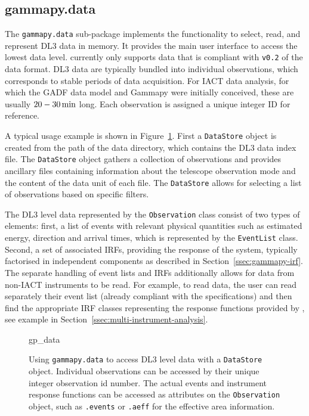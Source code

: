 \documentclass[traditabstract, longauth]{aa}
\newcommand{\code}[1]{\texttt{#1}}
\begin{document}
\subsection{gammapy.data}
\label{ssec:gammapy-data}
The \code{gammapy.data} sub-package implements the functionality to select,
read, and represent DL3 \gammaray data in memory. It provides the main user
interface to access the lowest data level. \gammapy currently only
supports data that is compliant with \code{v0.2} of the \gadf data format.
DL3 data are typically bundled into individual observations, which
corresponds to stable periods of data acquisition. For IACT data analysis,
for which the GADF data model and Gammapy were initially conceived,
these are usually $20 - 30\,{\rm min}$ long.
Each observation is assigned a unique integer ID for reference.

A typical usage example is shown in Figure~\ref{fig*:minted:gp_data}.
First a \code{DataStore} object is created from the path of the data
directory, which contains the DL3 data index file. The \code{DataStore}
object gathers a collection of observations and provides ancillary
files containing information about the telescope observation mode and the
content of the data unit of each file. The \code{DataStore} allows for
selecting a list of observations based on specific filters.

The DL3 level data represented by the \code{Observation} class consist
of two types of elements: first, a list of \gammaray events with relevant physical
quantities such as estimated energy, direction and arrival
times, which is represented by the \code{EventList} class. Second, a set of
associated IRFs, providing the response of the system, typically
factorised in independent components as described in
Section~\ref{ssec:gammapy-irf}. The separate handling of event lists and IRFs
additionally allows for data from non-IACT \gammaray instruments to be read. For
example, to read \fermi data, the user can read separately their event list
(already compliant with the \gadf specifications) and then find the appropriate
IRF classes representing the response functions provided by \fermi, see
example in Section~\ref{ssec:multi-instrument-analysis}.

\begin{figure}
	\small
	{gp_data}
	\caption{
        Using \code{gammapy.data} to access DL3 level data with a \code{DataStore} object.
        Individual observations can be accessed by their unique integer observation id number.
        The actual events and instrument response functions can be accessed
        as attributes on the \code{Observation} object, such as \code{.events}
        or \code{.aeff} for the effective area information.
    }
	\label{fig*:minted:gp_data}
\end{figure}
%
\end{document}
